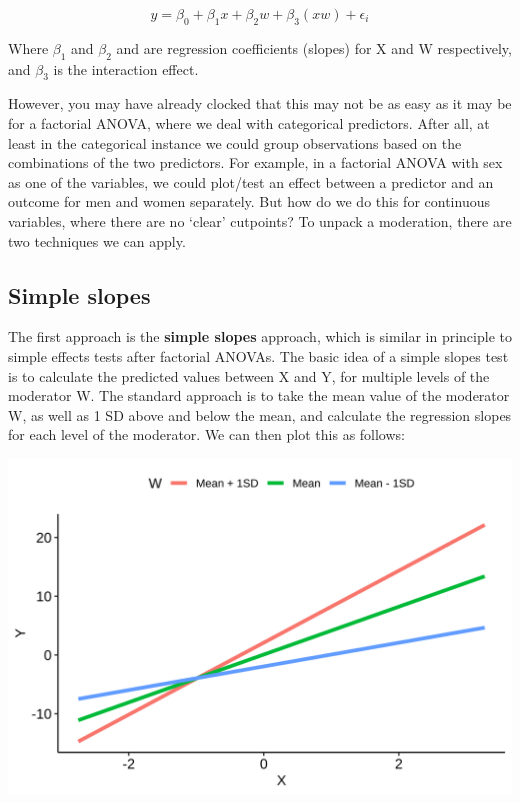 \documentclass[
]{book}
\begin{document}
\[
y = \beta_0 + \beta_1x + \beta_2w + \beta_3(xw) + \epsilon_i
\]

Where \(\beta_1\) and \(\beta_2\) and are regression coefficients (slopes) for X and W respectively, and \(\beta_3\) is the interaction effect.

However, you may have already clocked that this may not be as easy as it may be for a factorial ANOVA, where we deal with categorical predictors. After all, at least in the categorical instance we could group observations based on the combinations of the two predictors. For example, in a factorial ANOVA with sex as one of the variables, we could plot/test an effect between a predictor and an outcome for men and women separately. But how do we do this for continuous variables, where there are no `clear' cutpoints? To unpack a moderation, there are two techniques we can apply.

\subsection{Simple slopes}\label{simple-slopes}

The first approach is the \textbf{simple slopes} approach, which is similar in principle to simple effects tests after factorial ANOVAs. The basic idea of a simple slopes test is to calculate the predicted values between X and Y, for multiple levels of the moderator W. The standard approach is to take the mean value of the moderator W, as well as 1 SD above and below the mean, and calculate the regression slopes for each level of the moderator. We can then plot this as follows:

\begin{center}\includegraphics{img/interaction_plot} \end{center}
\end{document}
